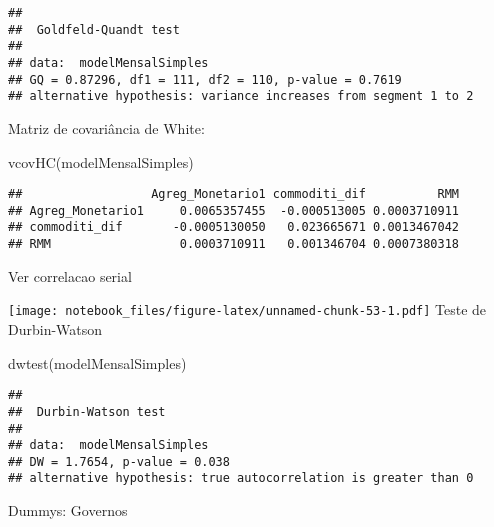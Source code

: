 \documentclass[
]{article}
\newenvironment{Shaded}{\begin{snugshade}}{\end{snugshade}}
\newcommand{\AttributeTok}[1]{\textcolor[rgb]{0.77,0.63,0.00}{#1}}
\newcommand{\FunctionTok}[1]{\textcolor[rgb]{0.00,0.00,0.00}{#1}}
\newcommand{\NormalTok}[1]{#1}
\newcommand{\SpecialCharTok}[1]{\textcolor[rgb]{0.00,0.00,0.00}{#1}}
\begin{document}
\begin{verbatim}
## 
##  Goldfeld-Quandt test
## 
## data:  modelMensalSimples
## GQ = 0.87296, df1 = 111, df2 = 110, p-value = 0.7619
## alternative hypothesis: variance increases from segment 1 to 2
\end{verbatim}

Matriz de covariância de White:

\begin{Shaded}
\begin{Highlighting}[]
\FunctionTok{vcovHC}\NormalTok{(modelMensalSimples)}
\end{Highlighting}
\end{Shaded}

\begin{verbatim}
##                  Agreg_Monetario1 commoditi_dif          RMM
## Agreg_Monetario1     0.0065357455  -0.000513005 0.0003710911
## commoditi_dif       -0.0005130050   0.023665671 0.0013467042
## RMM                  0.0003710911   0.001346704 0.0007380318
\end{verbatim}

Ver correlacao serial

\begin{Shaded}
\end{Shaded}

\texttt{[image: notebook\_files/figure-latex/unnamed-chunk-53-1.pdf]}
Teste de Durbin-Watson

\begin{Shaded}
\begin{Highlighting}[]
\FunctionTok{dwtest}\NormalTok{(modelMensalSimples)}
\end{Highlighting}
\end{Shaded}

\begin{verbatim}
## 
##  Durbin-Watson test
## 
## data:  modelMensalSimples
## DW = 1.7654, p-value = 0.038
## alternative hypothesis: true autocorrelation is greater than 0
\end{verbatim}

Dummys: Governos
\end{document}
